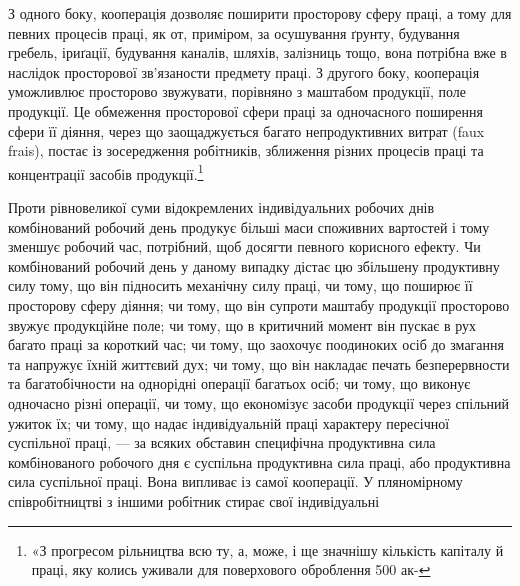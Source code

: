 З одного боку, кооперація дозволяє поширити просторову
сферу праці, а тому для певних процесів праці, як от, приміром,
за осушування ґрунту, будування гребель, іриґації, будування
каналів, шляхів, залізниць тощо, вона потрібна вже в наслідок
просторової зв’язаности предмету праці. З другого боку, кооперація
уможливлює просторово звужувати, порівняно з маштабом
продукції, поле продукції. Це обмеження просторової сфери праці
за одночасного поширення сфери її діяння, через що заощаджується
багато непродуктивних витрат (faux frais), постає із зосередження
робітників, зближення різних процесів праці та концентрації
засобів продукції.\footnote{
«З прогресом рільництва всю ту, а, може, і ще значнішу кількість
капіталу й праці, яку колись уживали для поверхового оброблення 500 ак-
}

Проти рівновеликої суми відокремлених індивідуальних робочих
днів комбінований робочий день продукує більші маси споживних
вартостей і тому зменшує робочий час, потрібний, щоб
досягти певного корисного ефекту. Чи комбінований робочий
день у даному випадку дістає цю збільшену продуктивну силу
тому, що він підносить механічну силу праці, чи тому, що поширює
її просторову сферу діяння; чи тому, що він супроти маштабу
продукції просторово звужує продукційне поле; чи тому, що в
критичний момент він пускає в рух багато праці за короткий час;
чи тому, що заохочує поодиноких осіб до змагання та напружує
їхній життєвий дух; чи тому, що він накладає печать безперервности
та багатобічности на однорідні операції багатьох осіб; чи
тому, що виконує одночасно різні операції, чи тому, що економізує
засоби продукції через спільний ужиток їх; чи тому, що надає
індивідуальній праці характеру пересічної суспільної праці, —
за всяких обставин специфічна продуктивна сила комбінованого
робочого дня є суспільна продуктивна сила праці, або продуктивна
сила суспільної праці. Вона випливає із самої кооперації. У пляномірному
співробітництві з іншими робітник стирає свої індивідуальні
